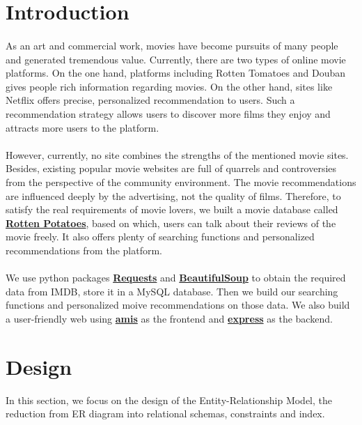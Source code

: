 \begin{CJK*}{UTF8}{gbsn}
\begin{titlepage}
    \vfill
    
\end{titlepage}

\tableofcontents
\pagebreak

\rmfamily
\section{Introduction}
\paragraph{}As an art and commercial work, movies have become pursuits of many people and generated tremendous value. Currently, there are two types of online movie platforms. On the one hand, platforms including Rotten Tomatoes and Douban gives people rich information regarding movies. On the other hand, sites like Netflix offers precise, personalized recommendation to users. Such a recommendation strategy allows users to discover more films they enjoy and attracts more users to the platform.
\paragraph{}However, currently, no site combines the strengths of the mentioned movie sites. Besides, existing popular movie websites are full of quarrels and controversies from the perspective of the community environment. The movie recommendations are influenced deeply by the advertising, not the quality of films. Therefore, to satisfy the real requirements of movie lovers, we built a movie database called \textbf{\href{http://10.20.9.99:3000}{Rotten Potatoes}}, based on which, users can talk about their reviews of the movie freely. It also offers plenty of searching functions and personalized recommendations from the platform. 
\paragraph{}We use python packages \textbf{\href{https://docs.python-requests.org/en/latest/}{Requests}} and \textbf{\href{https://www.crummy.com/software/BeautifulSoup/bs4/doc/}{BeautifulSoup}} to obtain the required data from IMDB, store it in a MySQL database. Then we build our searching functions and personalized moive recommendations on those data. We also build a user-friendly web using \textbf{\href{https://aisuda.bce.baidu.com/amis/zh-CN/docs/index}{amis}} as the frontend and \textbf{\href{https://expressjs.com}{express}} as the backend.
\section{Design}
In this section, we focus on the design of the Entity-Relationship Model, 
the reduction from ER diagram into relational schemas, constraints and index.


\end{CJK*}
